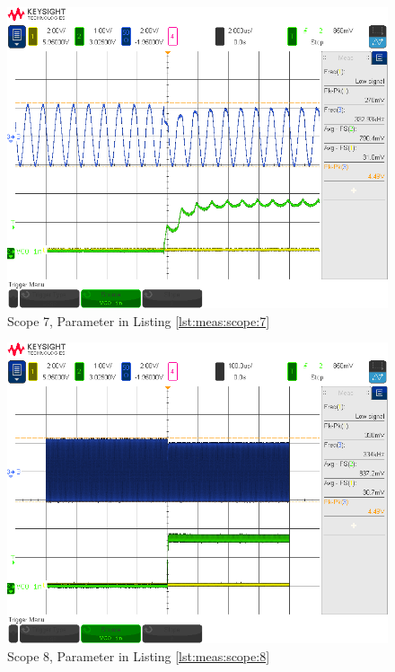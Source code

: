 \begin{figure}[h!tb]
    \centering
    \includegraphics[width=1\textwidth, trim=0mm 21mm 0mm 11mm, clip]{images/scopeShots/scope_7b.png}
    \caption{Scope 7, Parameter in Listing \ref{lst:meas:scope:7}}
    \label{fig:meas:scope:7}
\end{figure}

\begin{figure}[h!tb]
    \centering
    \includegraphics[width=1\textwidth, trim=0mm 21mm 0mm 11mm, clip]{images/scopeShots/scope_8b.png}
    \caption{Scope 8, Parameter in Listing \ref{lst:meas:scope:8}}
    \label{fig:meas:scope:8}
\end{figure}

